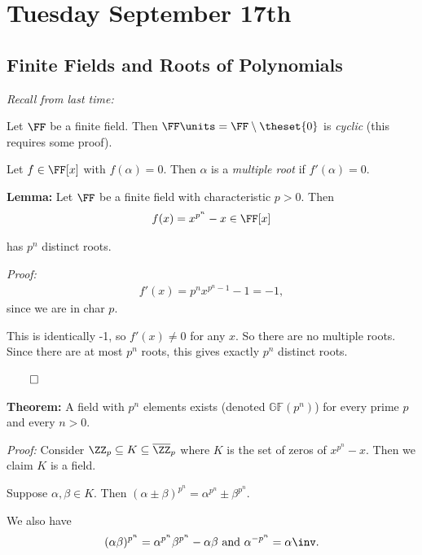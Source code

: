 \hypertarget{tuesday-september-17th}{%
\section{Tuesday September 17th}\label{tuesday-september-17th}}

\hypertarget{finite-fields-and-roots-of-polynomials}{%
\subsection{Finite Fields and Roots of
Polynomials}\label{finite-fields-and-roots-of-polynomials}}

\emph{Recall from last time:}

Let \(\FF\) be a finite field. Then
\(\FF\units = \FF\setminus\theset{0}\) is \emph{cyclic} (this requires
some proof).

Let \(f \in \FF[x]\) with \(f(\alpha) = 0\). Then \(\alpha\) is a
\emph{multiple root} if \(f'(\alpha) = 0\).

\textbf{Lemma:} Let \(\FF\) be a finite field with characteristic
\(p > 0\). Then
\begin{align*}
f(x) = x^{p^n} - x \in \FF[x]
\end{align*}

has \(p^n\) distinct roots.

\emph{Proof:}
\begin{align*}
f'(x) = p^n x^{p^n-1}-1 = -1
,\end{align*} since we are in char \(p\).

This is identically -1, so \(f'(x) \neq 0\) for any \(x\). So there are
no multiple roots. Since there are at most \(p^n\) roots, this gives
exactly \(p^n\) distinct roots.

\(\qed\)

\textbf{Theorem:} A field with \(p^n\) elements exists (denoted
\(\mathbb{GF}(p^n)\)) for every prime \(p\) and every \(n > 0\).

\emph{Proof:} Consider \(\ZZ_p \subseteq K \subseteq \overline{\ZZ}_p\)
where \(K\) is the set of zeros of \(x^{p^n}-x\). Then we claim \(K\) is
a field.

Suppose \(\alpha, \beta \in K\). Then
\((\alpha \pm \beta)^{p^n} = \alpha^{p^n} \pm \beta^{p^n}\).

We also have
\begin{align*}
(\alpha\beta)^{p^n} = \alpha^{p^n}\beta^{p^n} - \alpha\beta
\text{ and }
\alpha^{-p^n} = \alpha\inv
.\end{align*}

